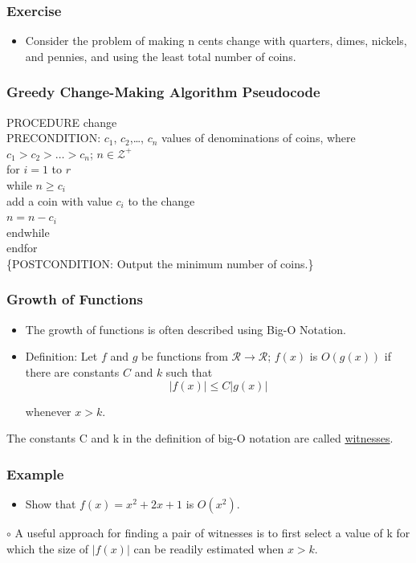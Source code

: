 \documentclass{beamer}
\newcommand{\s}{\vspace{0.2cm}} %
\begin{document}
\begin{frame}
\frametitle{\HandRightUp Exercise}
\begin{itemize} 
\Large
\item <1-> Consider the problem of making n cents change with quarters, dimes, nickels, and pennies, and using the least total number of coins.
\end{itemize}
\end{frame} 


\begin{frame}
\frametitle{\huge Greedy Change-Making Algorithm Pseudocode}
PROCEDURE change \\ 
PRECONDITION: $c_1$, $c_2$,\ldots, $c_n$ values of denominations of coins, where $c_1>c_2>\ldots>c_n$;
 $n \in \mathcal{Z}^+$ \\
\quad for $i = 1$ to $r$ \\
\quad while $n \ge c_i$ \\
\qquad add a coin with value $c_i$ to the change \\
\qquad $n= n - c_i$ \\
\quad endwhile \\
\quad endfor \\
\quad \{POSTCONDITION: Output the minimum number of coins.\}
\end{frame}


\begin{frame}
\frametitle{\huge Growth of Functions}
\begin{itemize} 
\Large
\item <1-> The growth of functions is often described using Big-O Notation.  
\item <2-> Definition: Let $f$ and $g$ be functions from $\mathcal{R} \to \mathcal{R}$; 
$f(x)$ is $O(g(x))$ if there are constants $C$ and $k$ such that \\

\[\left| {f\left( x \right)} \right| \leqslant C\left| {g\left( x \right)} \right|\] 

whenever $x > k$.
\end{itemize}
The constants C and k in the definition of big-O notation are called \underline{witnesses}.
\end{frame}


\begin{frame}
\frametitle{\huge Example}
\Large
\begin{itemize} 

\item <1->  Show that $f(x) = x^2 + 2x + 1$ is $O(x^2)$.
\end{itemize}
\s
$\circ$ A useful approach for finding a pair of witnesses is to first select a value of k for which the size of $|f(x)|$ can be readily estimated when $x > k$.
\end{frame}
\end{document}
